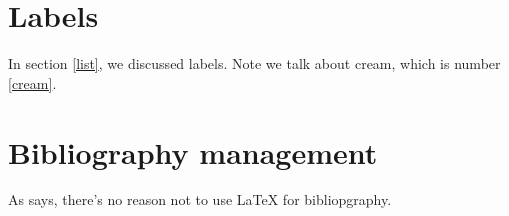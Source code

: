 \documentclass{article}
\begin{document}
\section{Labels}
In section \ref{list}, we discussed labels.
Note we talk about cream, which is number \ref{cream}.

\newpage

\section{Bibliography management}

As \textcite{test} says, there's no reason not to use \LaTeX{} for bibliopgraphy.

\parencite{chomsky05}

\printbibliography
\end{document}
